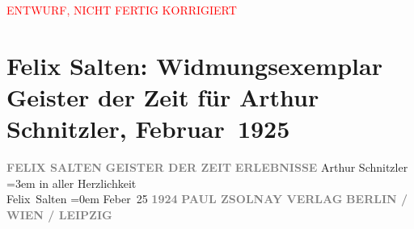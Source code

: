 
\begin{center}
            \textcolor{red}{ENTWURF, NICHT FERTIG KORRIGIERT}
                      \end{center}
            
         \renewcommand{\erwaehnteInstitutionen}{Institutionen: Paul Zsolnay Verlag}
         \renewcommand{\erwaehnteOrte}{Orte: Berlin, Leipzig, Wien}
         \renewcommand{\erwaehnteWerke}{Werke: Geister der Zeit. Erlebnisse}
               \section[Felix Salten: Widmungsexemplar Geister der Zeit für Arthur Schnitzler, Februar 1925]{ Felix Salten: Widmungsexemplar Geister der Zeit für Arthur Schnitzler,
               Februar 1925}\nopagebreak{}\rehead{ }\begin{ledgroupsized}[t]{13cm}\normalsize\beginnumbering \toendnotes[C]{\smallbreak\pagebreak[2]} 
\pstart
           \noindent{}\centering{}{\pb}\textcolor{gray}{\textbf{FELIX SALTEN}}\pend
           \pstart
           \noindent{}\centering{}\textcolor{gray}{\textbf{GEISTER DER ZEIT}}\pend
           \pstart
           \noindent{}\centering{}\textcolor{gray}{\textbf{ERLEBNISSE}}\pend
           {\bigskip}\pstart
           \noindent{}Arthur Schnitzler\pend
           \leftskip=3em{}\pstart
           \noindent{}in aller Herzlichkeit {\\}\spacefill\mbox{Felix Salten}\pend
           \leftskip=0em{}\pstart
           Feber 25\pend
           {\bigskip}\pstart
           \noindent{}\centering{}\textcolor{gray}{\textbf{1924}}\pend
           \pstart
           \noindent{}\centering{}\textcolor{gray}{\textbf{PAUL ZSOLNAY VERLAG}}\pend
           \pstart
           \noindent{}\centering{}\textcolor{gray}{\textbf{BERLIN / WIEN / LEIPZIG}}\pend
           
         
         \endnumbering{}\end{ledgroupsized}  \newcommand{\dateiname}{L03042}\newcommand{\titel}{Felix Salten: Widmungsexemplar Geister der Zeit für Arthur Schnitzler, Februar 1925}\newcommand{\editorInnen}{Martin Anton Müller und Laura Untner}
      